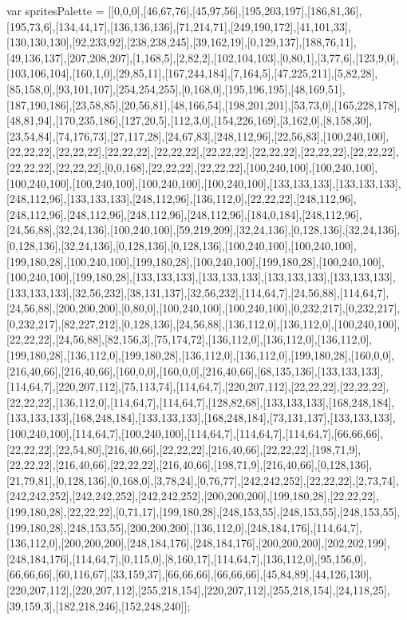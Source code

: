 var spritesPalette = [[0,0,0],[46,67,76],[45,97,56],[195,203,197],[186,81,36],[195,73,6],[134,44,17],[136,136,136],[71,214,71],[249,190,172],[41,101,33],[130,130,130],[92,233,92],[238,238,245],[39,162,19],[0,129,137],[188,76,11],[49,136,137],[207,208,207],[1,168,5],[2,82,2],[102,104,103],[0,80,1],[3,77,6],[123,9,0],[103,106,104],[160,1,0],[29,85,11],[167,244,184],[7,164,5],[47,225,211],[5,82,28],[85,158,0],[93,101,107],[254,254,255],[0,168,0],[195,196,195],[48,169,51],[187,190,186],[23,58,85],[20,56,81],[48,166,54],[198,201,201],[53,73,0],[165,228,178],[48,81,94],[170,235,186],[127,20,5],[112,3,0],[154,226,169],[3,162,0],[8,158,30],[23,54,84],[74,176,73],[27,117,28],[24,67,83],[248,112,96],[22,56,83],[100,240,100],[22,22,22],[22,22,22],[22,22,22],[22,22,22],[22,22,22],[22,22,22],[22,22,22],[22,22,22],[22,22,22],[22,22,22],[0,0,168],[22,22,22],[22,22,22],[100,240,100],[100,240,100],[100,240,100],[100,240,100],[100,240,100],[100,240,100],[133,133,133],[133,133,133],[248,112,96],[133,133,133],[248,112,96],[136,112,0],[22,22,22],[248,112,96],[248,112,96],[248,112,96],[248,112,96],[248,112,96],[184,0,184],[248,112,96],[24,56,88],[32,24,136],[100,240,100],[59,219,209],[32,24,136],[0,128,136],[32,24,136],[0,128,136],[32,24,136],[0,128,136],[0,128,136],[100,240,100],[100,240,100],[199,180,28],[100,240,100],[199,180,28],[100,240,100],[199,180,28],[100,240,100],[100,240,100],[199,180,28],[133,133,133],[133,133,133],[133,133,133],[133,133,133],[133,133,133],[32,56,232],[38,131,137],[32,56,232],[114,64,7],[24,56,88],[114,64,7],[24,56,88],[200,200,200],[0,80,0],[100,240,100],[100,240,100],[0,232,217],[0,232,217],[0,232,217],[82,227,212],[0,128,136],[24,56,88],[136,112,0],[136,112,0],[100,240,100],[22,22,22],[24,56,88],[82,156,3],[75,174,72],[136,112,0],[136,112,0],[136,112,0],[199,180,28],[136,112,0],[199,180,28],[136,112,0],[136,112,0],[199,180,28],[160,0,0],[216,40,66],[216,40,66],[160,0,0],[160,0,0],[216,40,66],[68,135,136],[133,133,133],[114,64,7],[220,207,112],[75,113,74],[114,64,7],[220,207,112],[22,22,22],[22,22,22],[22,22,22],[136,112,0],[114,64,7],[114,64,7],[128,82,68],[133,133,133],[168,248,184],[133,133,133],[168,248,184],[133,133,133],[168,248,184],[73,131,137],[133,133,133],[100,240,100],[114,64,7],[100,240,100],[114,64,7],[114,64,7],[114,64,7],[66,66,66],[22,22,22],[22,54,80],[216,40,66],[22,22,22],[216,40,66],[22,22,22],[198,71,9],[22,22,22],[216,40,66],[22,22,22],[216,40,66],[198,71,9],[216,40,66],[0,128,136],[21,79,81],[0,128,136],[0,168,0],[3,78,24],[0,76,77],[242,242,252],[22,22,22],[2,73,74],[242,242,252],[242,242,252],[242,242,252],[200,200,200],[199,180,28],[22,22,22],[199,180,28],[22,22,22],[0,71,17],[199,180,28],[248,153,55],[248,153,55],[248,153,55],[199,180,28],[248,153,55],[200,200,200],[136,112,0],[248,184,176],[114,64,7],[136,112,0],[200,200,200],[248,184,176],[248,184,176],[200,200,200],[202,202,199],[248,184,176],[114,64,7],[0,115,0],[8,160,17],[114,64,7],[136,112,0],[95,156,0],[66,66,66],[60,116,67],[33,159,37],[66,66,66],[66,66,66],[45,84,89],[44,126,130],[220,207,112],[220,207,112],[255,218,154],[220,207,112],[255,218,154],[24,118,25],[39,159,3],[182,218,246],[152,248,240]];

